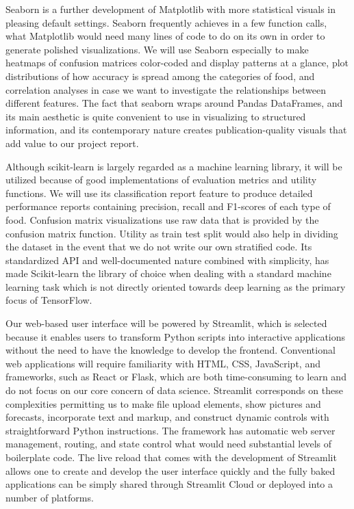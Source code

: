 \documentclass[12pt, openany]{report}
\begin{document}
Seaborn is a further development of Matplotlib with more statistical visuals in pleasing default settings. Seaborn frequently achieves in a few function calls, what Matplotlib would need many lines of code to do on its own in order to generate polished visualizations. We will use Seaborn especially to make heatmaps of confusion matrices color-coded and display patterns at a glance, plot distributions of how accuracy is spread among the categories of food, and correlation analyses in case we want to investigate the relationships between different features. The fact that seaborn wraps around Pandas DataFrames, and its main aesthetic is quite convenient to use in visualizing to structured information, and its contemporary nature creates publication-quality visuals that add value to our project report.

Although scikit-learn is largely regarded as a machine learning library, it will be utilized because of good implementations of evaluation metrics and utility functions. We will use its classification report feature to produce detailed performance reports containing precision, recall and F1-scores of each type of food. Confusion matrix visualizations use raw data that is provided by the confusion matrix function. Utility as train test split would also help in dividing the dataset in the event that we do not write our own stratified code. Its standardized API and well-documented nature combined with simplicity, has made Scikit-learn the library of choice when dealing with a standard machine learning task which is not directly oriented towards deep learning as the primary focus of TensorFlow.

Our web-based user interface will be powered by Streamlit, which is selected because it enables users to transform Python scripts into interactive applications without the need to have the knowledge to develop the frontend. Conventional web applications will require familiarity with HTML, CSS, JavaScript, and frameworks, such as React or Flask, which are both time-consuming to learn and do not focus on our core concern of data science. Streamlit corresponds on these complexities permitting us to make file upload elements, show pictures and forecasts, incorporate text and markup, and construct dynamic controls with straightforward Python instructions. The framework has automatic web server management, routing, and state control what would need substantial levels of boilerplate code. The live reload that comes with the development of Streamlit allows one to create and develop the user interface quickly and the fully baked applications can be simply shared through Streamlit Cloud or deployed into a number of platforms.
\end{document}
